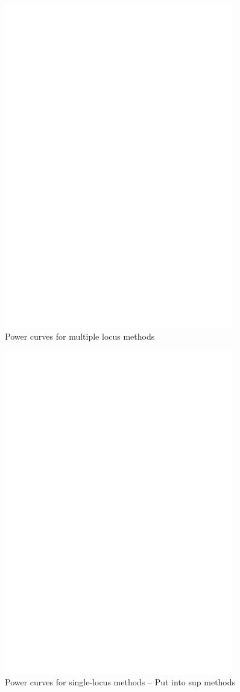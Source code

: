 \documentclass{nature}
\begin{document}
\begin{figure}
\label{fig_power_multiple}
\caption{Power curves for  multiple locus methods}
\includegraphics[width=10cm]{powerMultiple}
\end{figure}

\begin{figure}
\label{fig_power_single}
\caption{Power curves for single-locus methods -- Put into sup methods}
\includegraphics[width=10cm]{powerSingle}
\end{figure}
\end{document}
